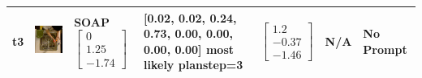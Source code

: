 \begin{longtable}{| V{0.8cm} | V{2.6cm} | V{1.6cm} | V{2.1cm} | V{1.55cm} | V{1.6cm} | V{3.2cm} |}
t3 &
\includegraphics[width=\linewidth]{fig/system/_slow2-soap_.jpg} &
SOAP
\linebreak\linebreak
$\begin{bmatrix}
0 \\
1.25 \\
-1.74
\end{bmatrix}$ &
[0.02, 0.02, 0.24, 0.73, 0.00, 0.00, 0.00, 0.00] most likely planstep=3 &
$\begin{bmatrix}
1.2 \\
-0.37 \\
-1.46
\end{bmatrix}$ &
N/A &
No Prompt
\\ \hline



\end{longtable}
